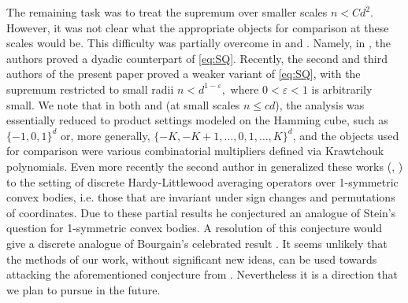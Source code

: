 \documentclass{article}
\theoremstyle{plain}
\numberwithin{equation}{section}
\begin{document}
The remaining task was to treat the supremum over smaller scales $n<Cd^2$. However, it was not clear what the appropriate objects for comparison at these scales would be. This difficulty was partially overcome in \cite{BMSWballs} and \cite{NiksinskiWrobel}. Namely, in \cite[Theorem~1.1]{BMSWballs}, the authors proved a dyadic counterpart of \eqref{eq:SQ}. Recently, the second and third authors of the present paper \cite[Theorem~1.1]{NiksinskiWrobel} proved a weaker variant of \eqref{eq:SQ}, with the supremum restricted to small radii $n<d^{1-\varepsilon},$ where $0<\varepsilon<1$ is arbitrarily small. We note that in both \cite{NiksinskiWrobel} and \cite{BMSWballs} (at small scales $n\leq cd$), the analysis was essentially reduced to product settings modeled on the Hamming cube, such as $\{-1,0,1\}^d$ or, more generally, $\{-K,-K+1,\ldots,0,1,\ldots,K\}^d$, and the objects used for comparison were various combinatorial multipliers defined via Krawtchouk polynomials. Even more recently the second author in \cite{Niksinski} generalized these works (\cite{BMSWballs}, \cite{NiksinskiWrobel}) to the setting of discrete Hardy-Littlewood averaging operators over 1-symmetric convex bodies, i.e. those that are invariant under sign changes and permutations of coordinates. Due to these partial results he conjectured an analogue of Stein's question for 1-symmetric convex bodies. A resolution of this conjecture would give a discrete analogue of Bourgain's celebrated result \cite{Bourgain}.  It seems unlikely that the methods of our work, without significant new ideas, can be used towards attacking the aforementioned conjecture from \cite{Niksinski}. Nevertheless it is a direction that we plan to pursue in the future.
\end{document}
